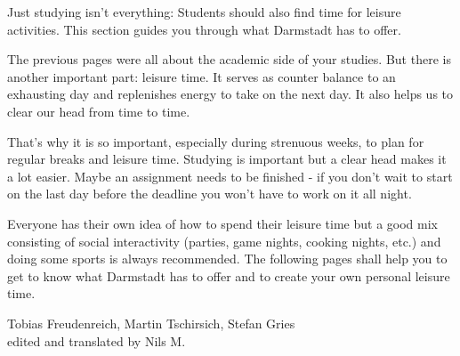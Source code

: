 {Just studying isn't everything: Students should also find time for leisure activities. This section guides you through what Darmstadt has to offer.
}{
The previous pages were all about the academic side of your studies. But there is another important part: leisure time. It serves as counter balance to an exhausting day and replenishes energy to take on the next day. It also helps us to clear our head from time to time.

That's why it is so important, especially during strenuous weeks, to plan for regular breaks and leisure time. Studying is important but a clear head makes it a lot easier. Maybe an assignment needs to be finished - if you don't wait to start on the last day before the deadline you won't have to work on it all night.

Everyone has their own idea of how to spend their leisure time but a good mix consisting of social interactivity (parties, game nights, cooking nights, etc.) and doing some sports is always recommended. The following pages shall help you to get to know what Darmstadt has to offer and to create your own personal leisure time.
}
{Tobias Freudenreich, Martin Tschirsich, Stefan Gries \\ edited and translated by Nils M.}